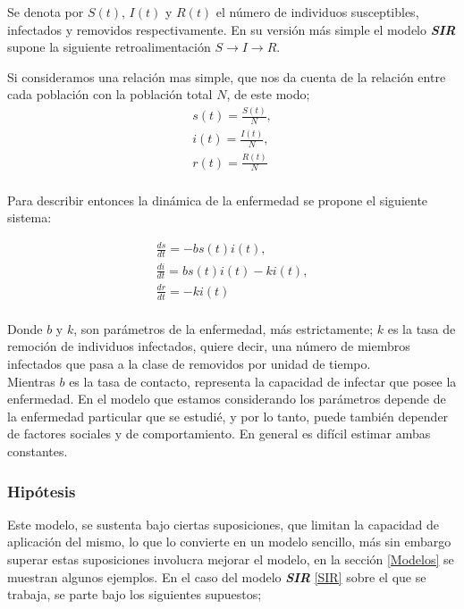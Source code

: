 \documentclass[journal]{IEEEtran}
\begin{document}
Se denota por $S(t)$, $I(t)$ y $R(t)$ el número de individuos susceptibles,
infectados y removidos respectivamente.
En su versión más simple el modelo \textbf{\textit{SIR}} supone la siguiente
retroalimentación $S \rightarrow I \rightarrow R$.\newline

Si consideramos una relación mas simple, que nos da cuenta de la relación entre
cada población con la población total $N$, de este modo;
\begin{equation} \label{poblaciones}
  \begin{split}
    s(t) = \frac{S(t)}{N},\\
    i(t) = \frac{I(t)}{N},\\
    r(t) = \frac{R(t)}{N}\\
  \end{split}
\end{equation}

Para describir entonces la dinámica de la enfermedad se propone el siguiente
sistema:

\begin{equation}\label{SIR}
  \begin{split}
    \frac{ds}{dt} = -bs(t)i(t),\\
    \frac{di}{dt} = bs(t)i(t)-ki(t),\\
    \frac{dr}{dt} = -ki(t)\\
  \end{split}
\end{equation}

Donde $b$ y $k$, son parámetros de la enfermedad, más estrictamente; $k$ es la
tasa de remoción de individuos infectados, quiere decir, una
número de miembros infectados que pasa a la clase de removidos por unidad de
tiempo.\\
Mientras $b$ es la tasa de contacto, representa la capacidad de infectar que
posee la enfermedad. En el modelo que estamos considerando los parámetros
depende de la enfermedad
particular que se estudié, y por lo tanto, puede también depender de factores
sociales y
de comportamiento. En general es difícil estimar ambas constantes.

\subsubsection{Hipótesis}
Este modelo, se sustenta bajo ciertas suposiciones, que limitan la capacidad de
aplicación del mismo, lo que lo convierte en un modelo sencillo,
más sin embargo superar estas suposiciones involucra mejorar el modelo, en la
sección \ref{Modelos} se muestran algunos ejemplos. En el caso del modelo
\textbf{\textit{SIR}} \ref{SIR}
sobre el que se trabaja, se parte bajo los siguientes supuestos;
\end{document}
